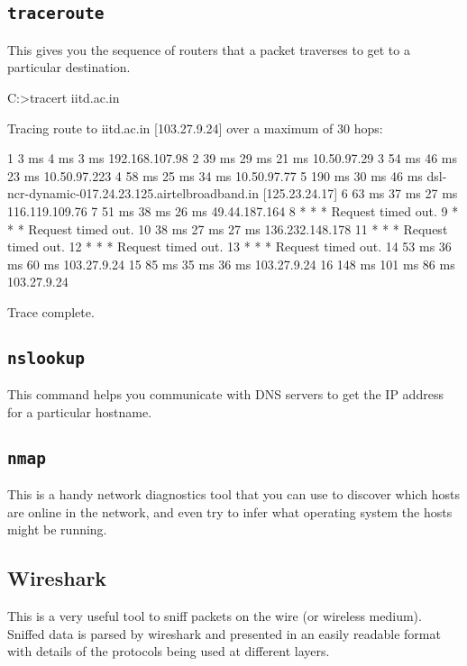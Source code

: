 \subsection{\tt traceroute}
This gives you the sequence of routers that a packet traverses to get to a particular destination.
\begin{code}
C:\Users\Anish>tracert iitd.ac.in

Tracing route to iitd.ac.in [103.27.9.24]
over a maximum of 30 hops:

1     3 ms     4 ms     3 ms  192.168.107.98
2    39 ms    29 ms    21 ms  10.50.97.29
3    54 ms    46 ms    23 ms  10.50.97.223
4    58 ms    25 ms    34 ms  10.50.97.77
5   190 ms    30 ms    46 ms  dsl-ncr-dynamic-017.24.23.125.airtelbroadband.in [125.23.24.17]
6    63 ms    37 ms    27 ms  116.119.109.76
7    51 ms    38 ms    26 ms  49.44.187.164
8     *        *        *     Request timed out.
9     *        *        *     Request timed out.
10    38 ms    27 ms    27 ms  136.232.148.178
11     *        *        *     Request timed out.
12     *        *        *     Request timed out.
13     *        *        *     Request timed out.
14    53 ms    36 ms    60 ms  103.27.9.24
15    85 ms    35 ms    36 ms  103.27.9.24
16   148 ms   101 ms    86 ms  103.27.9.24

Trace complete.
\end{code}
\subsection{\tt nslookup}
This command helps you communicate with DNS servers to get the IP address for a particular hostname.

\subsection{\tt nmap}
This is a handy network diagnostics tool that you can use to discover which hosts are online in the network, and even try to infer what operating system the hosts might be running.

\subsection{Wireshark}
This is a very useful tool to sniff packets on the wire (or wireless medium). Sniffed data is parsed by wireshark and presented in an easily readable format with details of the protocols being used at different layers.
